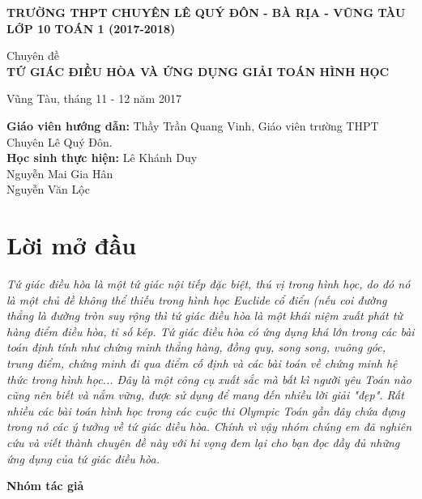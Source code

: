 \documentclass[12pt,a4paper]{article}
\begin{document}
\begin{center}
\textbf{TRƯỜNG THPT CHUYÊN LÊ QUÝ ĐÔN - BÀ RỊA - VŨNG TÀU}\\
\textbf{LỚP 10 TOÁN 1 (2017-2018)}\\
\end{center}
\begin{center}
\fontsize{20}{18}\selectfont
Chuyên đề\\
\textbf{TỨ GIÁC ĐIỀU HÒA VÀ ỨNG DỤNG GIẢI TOÁN HÌNH HỌC}
\end{center}
\begin{center}
\end{center}
\begin{flushright}
Vũng Tàu, tháng 11 - 12 năm 2017
\end{flushright}
\textbf{Giáo viên hướng dẫn:} Thầy Trần Quang Vinh, Giáo viên trường THPT Chuyên Lê Quý Đôn.\\
\textbf{Học sinh thực hiện:}
Lê Khánh Duy\\
Nguyễn Mai Gia Hân\\
Nguyễn Văn Lộc\\
\newpage
\tableofcontents
\newpage
\section{Lời mở đầu}
\textit{Tứ giác điều hòa là một tứ giác nội tiếp đặc biệt, thú vị trong hình học, do đó nó là một chủ đề không thể thiếu trong hình học Euclide cổ điển (nếu coi đường thẳng là đường tròn suy rộng thì tứ giác điều hòa là một khái niệm xuất phát từ hàng điểm điều hòa, tỉ số kép. Tứ giác điều hòa có ứng dụng khá lớn trong các bài toán định tính như chứng minh thẳng hàng, đồng quy, song song, vuông góc, trung điểm, chứng minh đi qua điểm cố định và các bài toán về chứng minh hệ thức trong hình học... Đây là một công cụ xuất sắc mà bất kì người yêu Toán nào cũng nên biết và nắm vững, được sử dụng để mang đến nhiều lời giải "đẹp". Rất nhiều các bài toán hình học trong các cuộc thi Olympic Toán gần đây chứa đựng trong nó các ý tưởng về tứ giác điều hòa. Chính vì vậy nhóm chúng em đã nghiên cứu và viết thành chuyên đề này với hi vọng đem lại cho bạn đọc đầy đủ những ứng dụng của tứ giác điều hòa.}
\begin{flushright}
\textbf{Nhóm tác giả}
\end{flushright}
\newpage
\end{document}
